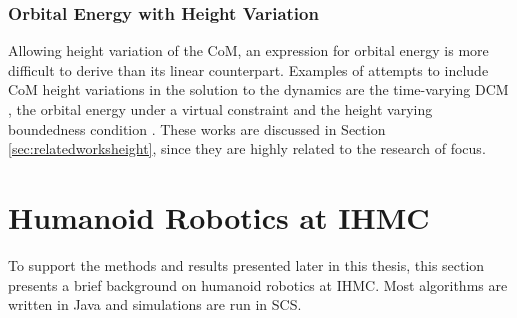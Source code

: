\subsubsection{Orbital Energy with Height Variation}\label{subsec:nonorbit} 
Allowing height variation of the \ac{CoM}, an expression for orbital energy is more difficult to derive than its linear counterpart.  Examples of attempts to include \ac{CoM} height variations in the solution to the dynamics are the time-varying \ac{DCM} \cite{hopkins2014humanoid}, the orbital energy under a virtual constraint \cite{pratt2007derivation} and the height varying boundedness condition \cite{caron2018balance}. These works are discussed in Section 
\ref{sec:relatedworksheight}, since they are highly related to the research of focus.

\section{Humanoid Robotics at IHMC}\label{sec:ihmc}
To support the methods and results presented later in this thesis, this section presents a brief background on humanoid robotics at \ac{IHMC}. Most algorithms are written in Java and simulations are run in \ac{SCS}.
